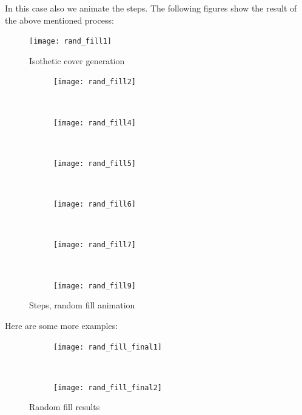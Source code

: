 \documentclass[12pt]{article}
\begin{document}
\newpage

In this case also we animate the steps. The following figures show the result of the above mentioned process:

\begin{figure}[H]
	\centering
	\texttt{[image: rand\_fill1]}
	\caption{Isothetic cover generation}
	\label{fig:fig_rand_fill1}
\end{figure}


\begin{figure}[H]
	\begin{subfigure}[b]{0.23\textwidth}
		\texttt{[image: rand\_fill2]}
	\end{subfigure}
	~
	\begin{subfigure}[b]{0.23\textwidth}
		\texttt{[image: rand\_fill4]}
	\end{subfigure}
	~
	\begin{subfigure}[b]{0.23\textwidth}
		\texttt{[image: rand\_fill5]}
	\end{subfigure}\centering
	~
	\begin{subfigure}[b]{0.23\textwidth}
		\texttt{[image: rand\_fill6]}
	\end{subfigure}
	~
	\begin{subfigure}[b]{0.23\textwidth}
		\texttt{[image: rand\_fill7]}
	\end{subfigure}
	~
	\begin{subfigure}[b]{0.23\textwidth}
		\texttt{[image: rand\_fill9]}
	\end{subfigure}
	\caption{Steps, random fill animation}
	\label{fig:fig_random_fill}
\end{figure}
\newpage
Here are some more examples:
\begin{figure}[H]
	\begin{subfigure}[b]{0.5\textwidth}
		\texttt{[image: rand\_fill\_final1]}
	\end{subfigure}
	~
	\begin{subfigure}[b]{0.5\textwidth}
		\texttt{[image: rand\_fill\_final2]}
	\end{subfigure}
	\caption{Random fill results}
	\label{fig:fig_random_fill}
\end{figure}

\vspace{8cm}
\end{document}
